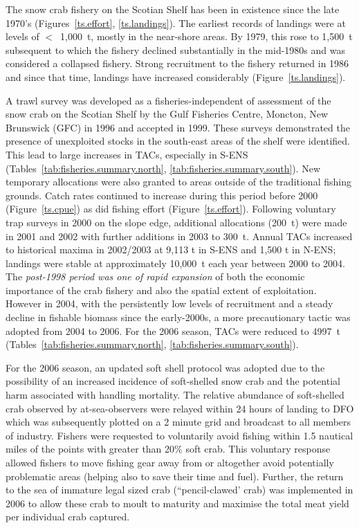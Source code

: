 \documentclass[11pt]{article}
\newcommand{\lt}{$<$}
\begin{document}
The snow crab fishery on the Scotian Shelf has been in existence since the late 1970's (Figures~\ref{ts.effort}, \ref{ts.landings}). The earliest records of landings were at levels of \lt~1,000~t, mostly in the near-shore areas. By 1979, this rose to 1,500~t subsequent to which the fishery declined substantially in the mid-1980s and was considered a collapsed fishery. Strong recruitment to the fishery returned in 1986 and since that time, landings have increased considerably (Figure~\ref{ts.landings}).

A trawl survey was developed as a fisheries-independent of assessment of the snow crab on the Scotian Shelf by the Gulf Fisheries Centre, Moncton, New Brunswick (GFC) in 1996 and accepted in 1999. These surveys demonstrated the presence of unexploited stocks in the south-east areas of the shelf were identified. This lead to large increases in TACs, especially in S-ENS (Tables~\ref{tab:fisheries.summary.north}, \ref{tab:fisheries.summary.south}). New temporary allocations were also granted to areas outside of the traditional fishing grounds. Catch rates continued to increase during this period before 2000 (Figure~\ref{ts.cpue}) as did fishing effort (Figure~\ref{ts.effort}). Following voluntary trap surveys in 2000 on the slope edge, additional allocations (200~t) were made in 2001 and 2002 with further additions in 2003 to 300~t. Annual TACs increased to historical maxima in 2002/2003 at 9,113 t in S-ENS and 1,500 t in N-ENS; landings were stable at approximately 10,000~t each year between 2000 to 2004. The \textit{post-1998 period was one of rapid expansion} of both the economic importance of the crab fishery and also the spatial extent of exploitation. However in 2004, with the persistently low levels of recruitment and a steady decline in fishable biomass since the early-2000s, a more precautionary tactic was adopted from 2004 to 2006. For the 2006 season, TACs were reduced to 4997~t (Tables~\ref{tab:fisheries.summary.north}, \ref{tab:fisheries.summary.south}). 

For the 2006 season, an updated soft shell protocol was adopted due to the possibility of an increased incidence of soft-shelled snow crab and the potential harm associated with handling mortality. The relative abundance of soft-shelled crab observed by at-sea-observers were relayed within 24 hours of landing to DFO which was subsequently  plotted on a 2 minute grid and broadcast to all members of industry. Fishers were requested to voluntarily avoid fishing within 1.5 nautical miles of the points with greater than 20\% soft crab. This voluntary response allowed fishers to move fishing gear away from or altogether avoid potentially problematic areas (helping also to save their time and fuel). Further, the return to the sea of immature legal sized crab (“pencil-clawed’ crab) was implemented in 2006 to allow these crab to moult to maturity and maximise the total meat yield per individual crab captured. 
\end{document}
